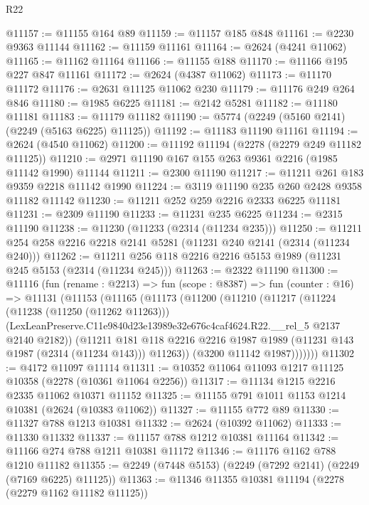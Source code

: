 \begin{lexlean}{R22}
\begin{coremodule}
@11157 := @11155 @164 @89
@11159 := @11157 @185 @848
@11161 := @2230 @9363 @11144
@11162 := @11159 @11161
@11164 := @2624 (@4241 @11062)
@11165 := @11162 @11164
@11166 := @11155 @188
@11170 := @11166 @195 @227 @847 @11161
@11172 := @2624 (@4387 @11062)
@11173 := @11170 @11172
@11176 := @2631 @11125 @11062 @230
@11179 := @11176 @249 @264 @846
@11180 := @1985 @6225
@11181 := @2142 @5281
@11182 := @11180 @11181
@11183 := @11179 @11182
@11190 := @5774 (@2249 (@5160 @2141) (@2249 (@5163 @6225) @11125))
@11192 := @11183 @11190 @11161
@11194 := @2624 (@4540 @11062)
@11200 := @11192 @11194 (@2278 (@2279 @249 @11182 @11125))
@11210 := @2971 @11190 @167 @155 @263 @9361 @2216 (@1985 @11142 @1990) @11144
@11211 := @2300 @11190
@11217 := @11211 @261 @183 @9359 @2218 @11142 @1990
@11224 := @3119 @11190 @235 @260 @2428 @9358 @11182 @11142
@11230 := @11211 @252 @259 @2216 @2333 @6225 @11181
@11231 := @2309 @11190
@11233 := @11231 @235 @6225
@11234 := @2315 @11190
@11238 := @11230 (@11233 (@2314 (@11234 @235)))
@11250 := @11211 @254 @258 @2216 @2218 @2141 @5281 (@11231 @240 @2141 (@2314 (@11234 @240)))
@11262 := @11211 @256 @118 @2216 @2216 @5153 @1989 (@11231 @245 @5153 (@2314 (@11234 @245)))
@11263 := @2322 @11190
@11300 := @11116
    (fun (rename : @2213) =>
    fun (scope : @8387) =>
    fun (counter : @16) =>
    @11131
      (@11153
        (@11165
          (@11173
            (@11200
              (@11210
                (@11217
                  (@11224
                    (@11238 (@11250 (@11262 @11263)))
                    (LexLeanPreserve.C11e9840d23e13989e32e676c4caf4624.R22.__rel_5
                      @2137
                      @2140
                      @2182))
                  (@11211
                    @181
                    @118
                    @2216
                    @2216
                    @1987
                    @1989
                    (@11231 @143 @1987 (@2314 (@11234 @143)))
                    @11263))
                (@3200 @11142 @1987)))))))
@11302 := @4172 @11097 @11114
@11311 := @10352 @11064 @11093 @1217 @11125 @10358 (@2278 (@10361 @11064 @2256))
@11317 := @11134 @1215 @2216 @2335 @11062 @10371 @11152
@11325 := @11155 @791 @1011 @1153 @1214 @10381 (@2624 (@10383 @11062))
@11327 := @11155 @772 @89
@11330 := @11327 @788 @1213 @10381
@11332 := @2624 (@10392 @11062)
@11333 := @11330 @11332
@11337 := @11157 @788 @1212 @10381 @11164
@11342 := @11166 @274 @788 @1211 @10381 @11172
@11346 := @11176 @1162 @788 @1210 @11182
@11355 := @2249 (@7448 @5153) (@2249 (@7292 @2141) (@2249 (@7169 @6225) @11125))
@11363 := @11346 @11355 @10381 @11194 (@2278 (@2279 @1162 @11182 @11125))

\end{coremodule}
\end{lexlean}
